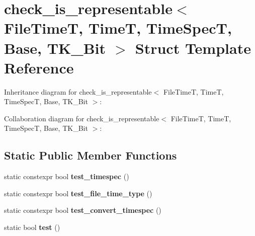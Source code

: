 \hypertarget{structcheck__is__representable_3_01_file_time_t_00_01_time_t_00_01_time_spec_t_00_01_base_00_01_t_k__32_bit_01_4}{}\section{check\+\_\+is\+\_\+representable$<$ File\+TimeT, TimeT, Time\+SpecT, Base, T\+K\+\_\+Bit $>$ Struct Template Reference}
\label{structcheck__is__representable_3_01_file_time_t_00_01_time_t_00_01_time_spec_t_00_01_base_00_01_t_k__32_bit_01_4}


Inheritance diagram for check\+\_\+is\+\_\+representable$<$ File\+TimeT, TimeT, Time\+SpecT, Base, T\+K\+\_\+Bit $>$\+:


Collaboration diagram for check\+\_\+is\+\_\+representable$<$ File\+TimeT, TimeT, Time\+SpecT, Base, T\+K\+\_\+Bit $>$\+:
\subsection*{Static Public Member Functions}
\begin{DoxyCompactItemize}
\item 
\mbox{\label{structcheck__is__representable_3_01_file_time_t_00_01_time_t_00_01_time_spec_t_00_01_base_00_01_t_k__32_bit_01_4_afbe02ef8c221362479d6a5fc561e028d}} 
static constexpr bool {\bfseries test\+\_\+timespec} ()
\item 
\mbox{\label{structcheck__is__representable_3_01_file_time_t_00_01_time_t_00_01_time_spec_t_00_01_base_00_01_t_k__32_bit_01_4_aca5709c96e15ae253fb164e5756ccc99}} 
static constexpr bool {\bfseries test\+\_\+file\+\_\+time\+\_\+type} ()
\item 
\mbox{\label{structcheck__is__representable_3_01_file_time_t_00_01_time_t_00_01_time_spec_t_00_01_base_00_01_t_k__32_bit_01_4_a83077225c3ea7b42262b80b2452afe41}} 
static constexpr bool {\bfseries test\+\_\+convert\+\_\+timespec} ()
\item 
\mbox{\label{structcheck__is__representable_3_01_file_time_t_00_01_time_t_00_01_time_spec_t_00_01_base_00_01_t_k__32_bit_01_4_afc5c5d307ffbb7a8495e67cf6719dfd4}} 
static bool {\bfseries test} ()
\end{DoxyCompactItemize}
